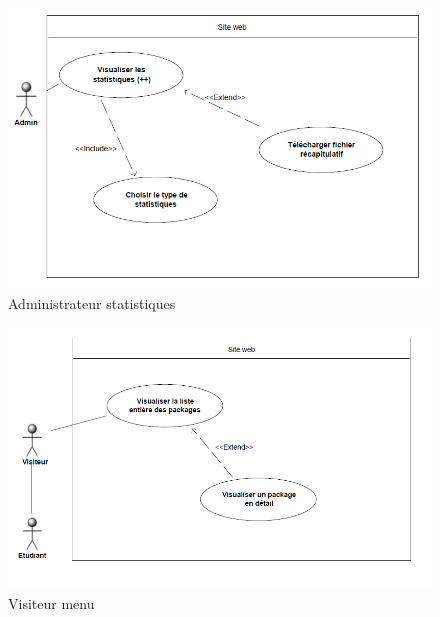     \begin{figure}[h]
        \begin{center}
            \includegraphics[scale=0.50]{images/uml/adminStats.png} 
        \end{center}

        \caption{Administrateur statistiques}
        \label{Administrateur statistiques}
    \end{figure}

    \begin{figure}[h]
        \begin{center}
            \includegraphics[scale=0.50]{images/uml/visiteurMenu.png} 
        \end{center}

        \caption{Visiteur menu}
        \label{Visiteur menu}
    \end{figure}

